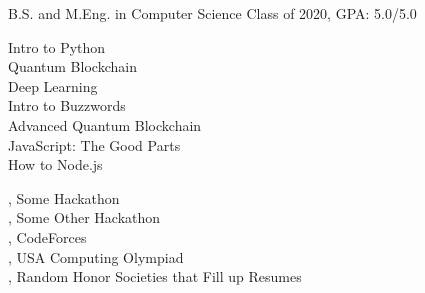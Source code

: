 \documentclass[10pt]{akshay-resume}
\begin{document}
%
%

\vspace{1em}

%
%

\begin{minipage}[t]{0.34\linewidth} 



{B.S. and M.Eng. in Computer Science}
{Class of 2020, GPA: 5.0/5.0}


\vspace{-1em}

{
Intro to Python\\
Quantum Blockchain\\
Deep Learning\\
Intro to Buzzwords\\
Advanced Quantum Blockchain \\
JavaScript: The Good Parts\\
How to Node.js
}



, Some Hackathon
\\ \vspace{0.5em}
, Some Other Hackathon
\\ \vspace{0.5em}
, CodeForces
\\ \vspace{0.5em}
, USA Computing Olympiad
\\ \vspace{0.5em}
, Random Honor Societies that Fill up Resumes


\end{minipage}
\end{document}
